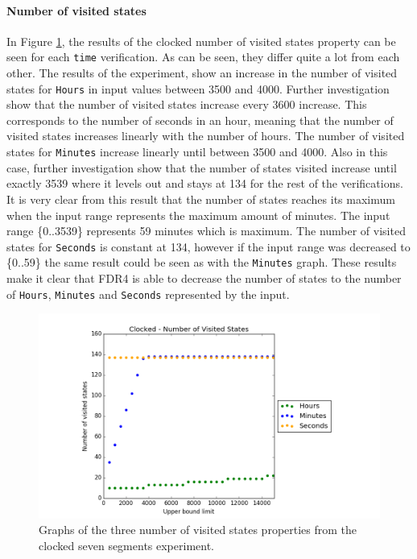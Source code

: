\paragraph{Number of visited states}
In Figure \ref{fig:clocked_states}, the results of the clocked number of visited states property can be seen for each \texttt{time} verification. As can be seen, they differ quite a lot from each other.
The results of the experiment, show an increase in the number of visited states for \texttt{Hours} in input values between 3500 and 4000. Further investigation show that the number of visited states increase every 3600 increase.
This corresponds to the number of seconds in an hour, meaning that the number of visited states increases linearly with the number of hours.
The number of visited states for \texttt{Minutes} increase linearly until between 3500 and 4000. Also in this case, further investigation show that the number of states visited increase until exactly 3539 where it levels out and stays at 134 for the rest of the verifications.
It is very clear from this result that the number of states reaches its maximum when the input range represents the maximum amount of minutes. The input range \{0..3539\} represents 59 minutes which is maximum. The number of visited states for \texttt{Seconds} is constant at 134, however if the input range was decreased to \{0..59\} the same result could be seen as with the \texttt{Minutes} graph. These results make it clear that FDR4 is able to decrease the number of states to the number of \texttt{Hours}, \texttt{Minutes} and \texttt{Seconds} represented by the input.
\begin{figure}
    \centering
    \includegraphics[scale=0.6]{./figures/plots/clocked_states.png}
\caption{Graphs of the three number of visited states properties from the clocked seven segments experiment.}
\label{fig:clocked_states}
\end{figure}
